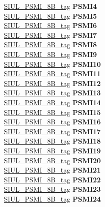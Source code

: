 \begin{DoxyCompactItemize}
\begin{tabbing}
\>\>\mbox{\hyperlink{unionSIUL__PSMI__8B__tag}{SIUL\_PSMI\_8B\_tag}} {\bfseries PSMI4}\\
\>\>\mbox{\hyperlink{unionSIUL__PSMI__8B__tag}{SIUL\_PSMI\_8B\_tag}} {\bfseries PSMI5}\\
\>\>\mbox{\hyperlink{unionSIUL__PSMI__8B__tag}{SIUL\_PSMI\_8B\_tag}} {\bfseries PSMI6}\\
\>\>\mbox{\hyperlink{unionSIUL__PSMI__8B__tag}{SIUL\_PSMI\_8B\_tag}} {\bfseries PSMI7}\\
\>\>\mbox{\hyperlink{unionSIUL__PSMI__8B__tag}{SIUL\_PSMI\_8B\_tag}} {\bfseries PSMI8}\\
\>\>\mbox{\hyperlink{unionSIUL__PSMI__8B__tag}{SIUL\_PSMI\_8B\_tag}} {\bfseries PSMI9}\\
\>\>\mbox{\hyperlink{unionSIUL__PSMI__8B__tag}{SIUL\_PSMI\_8B\_tag}} {\bfseries PSMI10}\\
\>\>\mbox{\hyperlink{unionSIUL__PSMI__8B__tag}{SIUL\_PSMI\_8B\_tag}} {\bfseries PSMI11}\\
\>\>\mbox{\hyperlink{unionSIUL__PSMI__8B__tag}{SIUL\_PSMI\_8B\_tag}} {\bfseries PSMI12}\\
\>\>\mbox{\hyperlink{unionSIUL__PSMI__8B__tag}{SIUL\_PSMI\_8B\_tag}} {\bfseries PSMI13}\\
\>\>\mbox{\hyperlink{unionSIUL__PSMI__8B__tag}{SIUL\_PSMI\_8B\_tag}} {\bfseries PSMI14}\\
\>\>\mbox{\hyperlink{unionSIUL__PSMI__8B__tag}{SIUL\_PSMI\_8B\_tag}} {\bfseries PSMI15}\\
\>\>\mbox{\hyperlink{unionSIUL__PSMI__8B__tag}{SIUL\_PSMI\_8B\_tag}} {\bfseries PSMI16}\\
\>\>\mbox{\hyperlink{unionSIUL__PSMI__8B__tag}{SIUL\_PSMI\_8B\_tag}} {\bfseries PSMI17}\\
\>\>\mbox{\hyperlink{unionSIUL__PSMI__8B__tag}{SIUL\_PSMI\_8B\_tag}} {\bfseries PSMI18}\\
\>\>\mbox{\hyperlink{unionSIUL__PSMI__8B__tag}{SIUL\_PSMI\_8B\_tag}} {\bfseries PSMI19}\\
\>\>\mbox{\hyperlink{unionSIUL__PSMI__8B__tag}{SIUL\_PSMI\_8B\_tag}} {\bfseries PSMI20}\\
\>\>\mbox{\hyperlink{unionSIUL__PSMI__8B__tag}{SIUL\_PSMI\_8B\_tag}} {\bfseries PSMI21}\\
\>\>\mbox{\hyperlink{unionSIUL__PSMI__8B__tag}{SIUL\_PSMI\_8B\_tag}} {\bfseries PSMI22}\\
\>\>\mbox{\hyperlink{unionSIUL__PSMI__8B__tag}{SIUL\_PSMI\_8B\_tag}} {\bfseries PSMI23}\\
\>\>\mbox{\hyperlink{unionSIUL__PSMI__8B__tag}{SIUL\_PSMI\_8B\_tag}} {\bfseries PSMI24}\\

\end{tabbing}
\end{DoxyCompactItemize}
